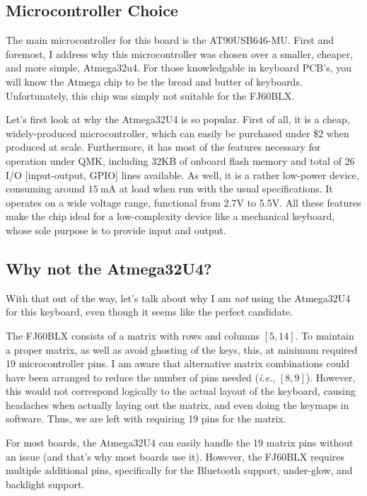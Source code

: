 \documentclass[11pt]{article}
\begin{document}
\subsection{Microcontroller Choice}

The main microcontroller for this board is the AT90USB646-MU. First and foremost, I address why this microcontroller was chosen over a smaller, cheaper, and more simple, Atmega32u4. For those knowledgable in keyboard PCB's, you will know the Atmega chip to be the bread and butter of keyboards. Unfortunately, this chip was simply not suitable for the FJ60BLX.

Let's first look at why the Atmega32U4 is so popular. First of all, it is a cheap, widely-produced microcontroller, which can easily be purchased under \$2 when produced at scale. Furthermore, it has most of the features necessary for operation under QMK, including 32KB of onboard flash memory and total of 26 I/O [input-output, GPIO] lines available. As well, it is a rather low-power device, consuming around $\SI{15}{\milli\ampere}$ at load when run with the usual specifications. It operates on a wide voltage range, functional from 2.7V to 5.5V. All these features make the chip ideal for a low-complexity device like a mechanical keyboard, whose sole purpose is to provide input and output.

\subsection{Why not the Atmega32U4?}

With that out of the way, let's talk about why I am \emph{not} using the Atmega32U4 for this keyboard, even though it seems like the perfect candidate.

The FJ60BLX consists of a matrix with rows and columns \([5,14]\). To maintain a proper matrix, as well as avoid ghosting of the keys, this, at minimum required 19 microcontroller pins. I am aware that alternative matrix combinations could have been arranged to reduce the number of pins needed (\emph{i.e.}, \([8,9]\)). However, this would not correspond logically to the actual layout of the keyboard, causing headaches when actually laying out the matrix, and even doing the keymaps in software. Thus, we are left with requiring 19 pins for the matrix.

For most boards, the Atmega32U4 can easily handle the 19 matrix pins without an issue (and that's why most boards use it). However, the FJ60BLX requires multiple additional pins, specifically for the Bluetooth support, under-glow, and backlight support. 
\end{document}

